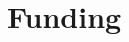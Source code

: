 \documentclass[amstex,11pt]{amsart}
\numberwithin{equation}{section}
\newcommand{\Q}{\mathbb Q}
\begin{document}
\begin{comment}
Once one has a list of possible conductors, one must find equations of
elliptic curves in each isogeny class.  To do this we use similar
techniques as in Section \ref{sec:ECQrt5}: naive enumeration,
Cremona--Lingham, searching in torsion families, and so on. 
Stein and Gunnells will coordinate on this work.
Once a curve in each
isogeny class is found, work of Billerey \cite{billerey} enables us to
compute representatives for each of the isomorphism classes, just as
for the $\Q(\sqrt{5})$ case.

We propose to work towards the following goals:

\begin{enumerate}
\item Extension of the tables in \cite{complexcubic, neg23} as far as
possible.
\item Extending the computations in \cite{complexcubic, neg23} for other
complex cubic fields. %
Data for elliptic curves over
the fields of discriminants  $-31$, \dots , $-107$ can be found at
\cite{ariah} and in \cite{torsioncubic}.
\item Extend the computations of \cite{complexcubic} to nontrivial
coefficients, i.e.~compile tables of higher weight cuspforms.
\item Incorporate all this data into the LMFDB.
\end{enumerate}






\subsection{Already in intro?}
We propose a workshop in which each day features two talks providing
background information and describing recent work and current problems
of interest.  Each afternoon will involve group work in which
the participants are actively engaged in a variety of activities related
to the workshop focus.  Those activities will include starting or
continuing research projects, going through the details of advanced
material which was not covered in the lectures, and working to put
new material into the $L$-functions and Modular Forms Database 

\end{comment}

\section{Funding}
\end{document}
